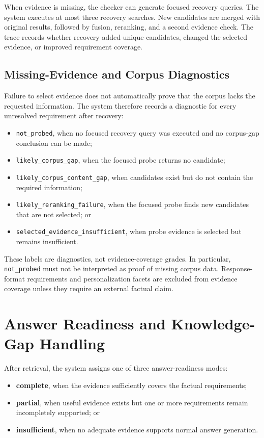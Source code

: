 When evidence is missing, the checker can generate focused recovery queries.
The system executes at most three recovery searches. New candidates are merged
with original results, followed by fusion, reranking, and a second evidence
check. The trace records whether recovery added unique candidates, changed the
selected evidence, or improved requirement coverage.

\subsection{Missing-Evidence and Corpus Diagnostics}

Failure to select evidence does not automatically prove that the corpus lacks
the requested information. The system therefore records a diagnostic for every
unresolved requirement after recovery:

\begin{itemize}
    \item \texttt{not\_probed}, when no focused recovery query was executed and
    no corpus-gap conclusion can be made;
    \item \texttt{likely\_corpus\_gap}, when the focused probe returns no
    candidate;
    \item \texttt{likely\_corpus\_content\_gap}, when candidates exist but do
    not contain the required information;
    \item \texttt{likely\_reranking\_failure}, when the focused probe finds new
    candidates that are not selected; or
    \item \texttt{selected\_evidence\_insufficient}, when probe evidence is
    selected but remains insufficient.
\end{itemize}

These labels are diagnostics, not evidence-coverage grades. In particular,
\texttt{not\_probed} must not be interpreted as proof of missing corpus data.
Response-format requirements and personalization facets are excluded from
evidence coverage unless they require an external factual claim.

\section{Answer Readiness and Knowledge-Gap Handling}

After retrieval, the system assigns one of three answer-readiness modes:

\begin{itemize}
    \item \textbf{complete}, when the evidence sufficiently covers the factual
    requirements;
    \item \textbf{partial}, when useful evidence exists but one or more
    requirements remain incompletely supported; or
    \item \textbf{insufficient}, when no adequate evidence supports normal
    answer generation.
\end{itemize}

